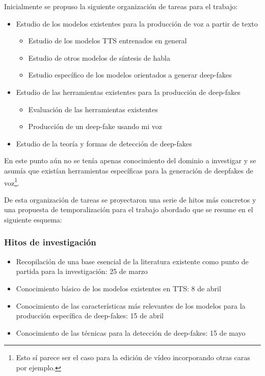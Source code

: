 Inicialmente se propuso la siguiente organización de tareas para el trabajo:

\begin{itemize}

\item Estudio de los modelos existentes para la producción de voz a partir de texto

    \begin{itemize}
    \item Estudio de los modelos TTS entrenados en general
    \item Estudio de otros modelos de síntesis de habla
    \item Estudio específico de los modelos orientados a generar deep-fakes
    \end{itemize}
\item Estudio de las herramientas existentes para la producción de deep-fakes
    \begin{itemize}
         \item Evaluación de las herramientas existentes
         \item Producción de un deep-fake usando mi voz
    \end{itemize}
\item Estudio de la teoría y formas de detección de deep-fakes
\end{itemize}

En este punto aún no se tenía apenas conocimiento del dominio a investigar y se asumía que existían herramientas específicas para la generación de deepfakes de voz\footnote{Esto sí parece ser el caso para la edición de vídeo incorporando otras caras por ejemplo.}.

De esta organización de tareas se proyectaron una serie de hitos más concretos y una propuesta de temporalización para el trabajo abordado que se resume en el siguiente esquema:

\subsubsection{Hitos de investigación}

\begin{itemize}
    \item Recopilación de una base esencial de la literatura existente como punto de partida para la investigación: 25 de marzo
    \item Conocimiento básico de los modelos existentes en TTS: 8 de abril
    \item Conocimiento de las características más relevantes de los modelos para la producción específica de deep-fakes: 15 de abril
    \item Conocimiento de las técnicas para la detección de deep-fakes: 15 de mayo
\end{itemize}

